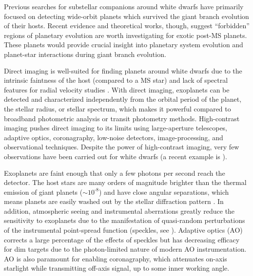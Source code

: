\documentclass[twocolumn,linenumbers]{aastex631}
\begin{document}
Previous searches for substellar companions around white dwarfs \citep[e.g.,][]{debesAreThereUnstable2002,hoganDODOSurveyII2009,luhmanDiscoveryCandidateCoolest2011,xuExtremeAOSearchGiant2015a} have primarily focused on detecting wide-orbit planets which survived the giant branch evolution of their hosts. Recent evidence and theoretical works, though, suggest ``forbidden'' regions of planetary evolution are worth investigating for exotic post-MS planets. These planets would provide crucial insight into planetary system evolution and planet-star interactions during giant branch evolution.

Direct imaging is well-suited for finding planets around white dwarfs due to the intrinsic faintness of the host (compared to a MS star) and lack of spectral features for radial velocity studies \citep{burleighImagingPlanetsNearby2002a}. With direct imaging, exoplanets can be detected and characterized independently from the orbital period of the planet, the stellar radius, or stellar spectrum, which makes it powerful compared to broadband photometric analysis or transit photometry methods. High-contrast imaging pushes direct imaging to its limits using large-aperture telescopes, adaptive optics, coronagraphy, low-noise detectors, image-processing, and observational techniques. Despite the power of high-contrast imaging, very few observations have been carried out for white dwarfs (a recent example is \citealt{pathakHighContrastImaging2021}).

Exoplanets are faint enough that only a few photons per second reach the detector. The host stars are many orders of magnitude brighter than the thermal emission of giant planets ($\sim10^{\text{-}8}$) and have close angular separations, which means planets are easily washed out by the stellar diffraction pattern \citep{traubDirectImagingExoplanets2010}. In addition, atmospheric seeing and instrumental aberrations greatly reduce the sensitivity to exoplanets due to the manifestation of quasi-random perturbations of the instrumental point-spread function (speckles, see \citealp{guyonExtremeAdaptiveOptics2018}). Adaptive optics (AO) corrects a large percentage of the effects of speckles but has decreasing efficacy for dim targets due to the photon-limited nature of modern AO instrumentation. AO is also paramount for enabling coronagraphy, which attenuates on-axis starlight while transmitting off-axis signal, up to some inner working angle.
\end{document}
